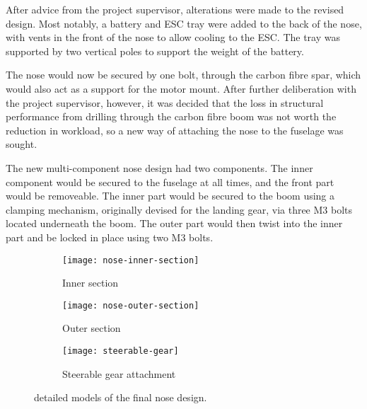 \documentclass[../../main.tex]{subfiles}
\begin{document}

After advice from the project supervisor, alterations were made to the revised design.
Most notably, a battery and ESC tray were added to the back of the nose, with vents in the front of the nose to allow cooling to the ESC.
The tray was supported by two vertical poles to support the weight of the battery. 


The nose would now be secured by one bolt, through the carbon fibre spar, which would also act as a support for the motor mount.
After further deliberation with the project supervisor, however, it was decided that the loss in structural performance from drilling through the carbon fibre boom was not worth the reduction in workload, so a new way of attaching the nose to the fuselage was sought.  

The new multi-component nose design had two components.
The inner component would be secured to the fuselage at all times, and the front part would be removeable.
The inner part would be secured to the boom using a clamping mechanism, originally devised for the landing gear, via three M3 bolts located underneath the boom.
The outer part would then twist into the inner part and be locked in place using two M3 bolts. 

\begin{figure}[H]
    \centering
    \begin{subfigure}[b]{0.6\columnwidth}
        \centering
        \texttt{[image: nose-inner-section]}
        \caption{Inner section}
        \label{fig:nose-design:inner}
    \end{subfigure}
    
    \begin{subfigure}[b]{0.6\columnwidth}
        \centering
        \texttt{[image: nose-outer-section]}
        \caption{Outer section}
        \label{fig:nose-design:outer}
    \end{subfigure}

    \begin{subfigure}[b]{0.6\columnwidth}
        \centering
        \texttt{[image: steerable-gear]}
        \caption{Steerable gear attachment}
        \label{fig:nose-design:steerable-nose-gear}
    \end{subfigure}
    
    \caption{detailed models of the final nose design.}
    \label{fig:nose-design}
\end{figure} 
\end{document}
